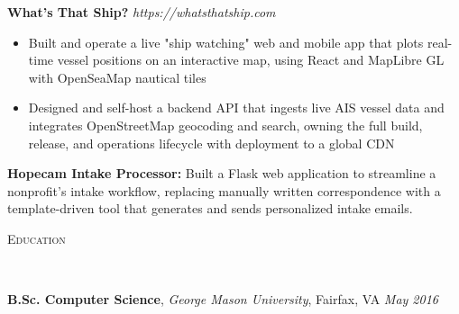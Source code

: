 \documentclass[a4paper,9pt]{extarticle}
\newenvironment{changemargin}[2]{%
  \begin{list}{}{%
    \setlength{\topsep}{0pt}%
    \setlength{\leftmargin}{#1}%
    \setlength{\rightmargin}{#2}%
    \setlength{\listparindent}{\parindent}%
    \setlength{\itemindent}{\parindent}%
    \setlength{\parsep}{\parskip}%
  }%
  \item[]}{\end{list}
}
\newcommand{\lineover}{
	\begin{changemargin}{-0.05in}{-0.05in}
		\vspace*{-8pt}
		\hrulefill \\
		\vspace*{0pt}
	\end{changemargin}
}
\newcommand{\header}[1]{
	\begin{changemargin}{-0.5in}{-0.5in}
		\scshape{#1}\\
  	\lineover
	\end{changemargin}
}
\newenvironment{body} {
	\vspace*{-10pt}
	\begin{changemargin}{-0.25in}{-0.5in}
  }	
	{\end{changemargin}
}
\begin{document}
\begin{body}
	\vspace{12pt}
	\textbf{What's That Ship?} \hfill \emph{https://whatsthatship.com}\\
	\vspace*{0pt}
	\begin{itemize} \itemsep 3pt  %
		\item  Built and operate a live "ship watching" web and mobile app that plots real-time vessel positions on an interactive map, using React and MapLibre GL with OpenSeaMap nautical tiles
		\item  Designed and self-host a backend API that ingests live AIS vessel data and integrates OpenStreetMap geocoding and search, owning the full build, release, and operations lifecycle with deployment to a global CDN
	\end{itemize}
	{\textbf{Hopecam Intake Processor:}}{} Built a Flask web application to streamline a nonprofit's intake workflow, replacing manually written correspondence with a template-driven tool that generates and sends personalized intake emails.\\
	\vspace{9pt}
\end{body}

\header{Education}

\begin{body}
	\vspace{12pt}
	\textbf{B.Sc. Computer Science}, \emph{George Mason University}, Fairfax, VA \hfill \emph{May 2016}\\
	\vspace{4pt}
\end{body}
\smallskip
\end{document}
